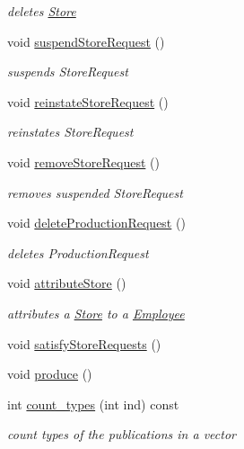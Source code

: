 \begin{DoxyCompactItemize}
\begin{DoxyCompactList}\small\item\em deletes \hyperlink{class_store}{Store} \end{DoxyCompactList}\item 
void \hyperlink{class_headquarters_aa81365ae7d4af8d3c7e5c8326a72c6f9}{suspend\+Store\+Request} ()
\begin{DoxyCompactList}\small\item\em suspends Store\+Request \end{DoxyCompactList}\item 
void \hyperlink{class_headquarters_a24447bf2bad345696c27ed6e9bee0ebc}{reinstate\+Store\+Request} ()
\begin{DoxyCompactList}\small\item\em reinstates Store\+Request \end{DoxyCompactList}\item 
void \hyperlink{class_headquarters_abde45af2d9335adde7f61dc30ced4995}{remove\+Store\+Request} ()
\begin{DoxyCompactList}\small\item\em removes suspended Store\+Request \end{DoxyCompactList}\item 
void \hyperlink{class_headquarters_a943b8cc7b3c1c8c8a126065897512b91}{delete\+Production\+Request} ()
\begin{DoxyCompactList}\small\item\em deletes Production\+Request \end{DoxyCompactList}\item 
void \hyperlink{class_headquarters_ad162fb3833c24833a0ac83b50f3df91b}{attribute\+Store} ()
\begin{DoxyCompactList}\small\item\em attributes a \hyperlink{class_store}{Store} to a \hyperlink{class_employee}{Employee} \end{DoxyCompactList}\item 
void \hyperlink{class_headquarters_a39f2fbf0b8bb68a87eb0c74d659935cd}{satisfy\+Store\+Requests} ()
\item 
void \hyperlink{class_headquarters_ab572bdf482526f637732ae8736fc1860}{produce} ()
\item 
int \hyperlink{class_headquarters_a6951a0254016c43b0d54bd17195d711d}{count\+\_\+types} (int ind) const
\begin{DoxyCompactList}\small\item\em count types of the publications in a vector \end{DoxyCompactList}\item 

\end{DoxyCompactItemize}
